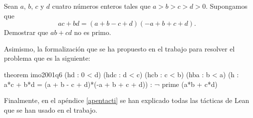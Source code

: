 Sean \(a\), \(b\), \(c\) y \(d\) cuatro números enteros tales que
\(a > b > c > d > 0\). Supongamos que
\begin{equation*}
  ac+bd = (a+b-c+d)(-a+b+c+d).
\end{equation*}
Demostrar que \(ab+cd\) no es primo.

Asimismo, la formalización que se ha propuesto en el trabajo para resolver el
problema que es la siguiente:

\begin{leancode}
theorem imo2001q6
  (hd  : 0 < d)
  (hdc : d < c)
  (hcb : c < b)
  (hba : b < a)
  (h : a*c + b*d = (a + b - c + d)*(-a + b + c + d))
  : ¬ prime (a*b + c*d)
\end{leancode}



Finalmente, en el apéndice \ref{apentacti} se han explicado todas
las tácticas de Lean que se han usado en el trabajo.



%
%

